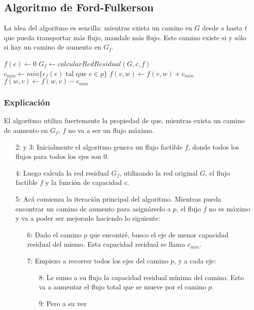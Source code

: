 \subsection{Algoritmo de Ford-Fulkerson}

La idea del algoritmo es sencilla: mientras exista un camino en $G$ desde $s$ hasta $t$ que pueda transportar m\'as flujo, mandale m\'as flujo. Este camino existe si y s\'olo si hay un camino de aumento en $G_f$.

\begin{algorithm}
\begin{algorithmic}[1]
    \State $f(e) \gets 0$
  \EndFor
  \State $G_f \gets calcularRedResidual(G, c, f)$
    \State $c_{min} \gets min\{c_f(e) \textrm{ tal que } e \in p\}$
        \State $f(v,w) \gets f(v,w) + c_{min}$
        \State $f(w,v) \gets f(w,v) - c_{min}$ 
    \EndFor
  \EndWhile
\EndFunction
\end{algorithmic}
\end{algorithm}

\subsubsection*{Explicaci\'on}

El algoritmo utiliza fuertemente la propiedad de que, mientras exista un camino de aumento en $G_f$, $f$ no va a ser un flujo m\'aximo. 

\begin{enumerate}
\item [2: y 3:] Inicialmente el algoritmo genera un flujo factible $f$, donde todos los flujos para todos los ejes son $0$.
\item [4:] Luego calcula la red residual $G_f$, utilizando la red original $G$, el flujo factible $f$ y la funci\'on de capacidad $c$.
\item [5:] Ac\'a comienza la iteraci\'on principal del algoritmo. Mientras pueda encontrar un camino de aumento para asign\'arselo a $p$, el flujo $f$ no es m\'aximo y va a poder ser mejorado haciendo lo siguiente:
  \begin{enumerate}
  \item [6:] Dado el camino $p$ que encontr\'e, busco el eje de menor capacidad residual del mismo. Esta capacidad residual se llama $c_{min}$.
  \item [7:] Empiezo a recorrer todos los ejes del camino $p$, y a cada eje:
    \begin{enumerate}
      \item [8:] Le sumo a su flujo la capacidad residual m\'inima del camino. Esto va a aumentar el flujo total que se mueve por el camino $p$.
      \item [9:] Pero a su vez
    \end{enumerate}
  \end{enumerate}
\end{enumerate}

